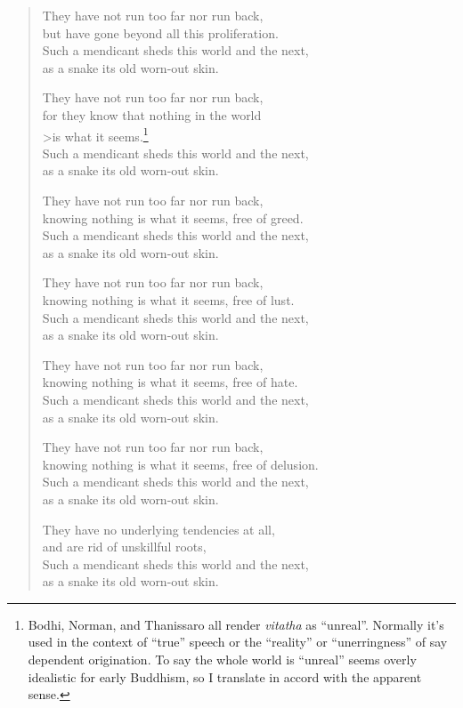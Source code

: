 \documentclass[12pt,openany]{book}%
\begin{document}
\begin{verse}
They have not run too far nor run back, \\
but have gone beyond all this proliferation. \\
Such a mendicant sheds this world and the next, \\
as a snake its old worn-out skin. 

They have not run too far nor run back, \\
for they know that nothing in the world \\>is what it seems.\footnote{Bodhi, Norman, and Thanissaro all render \textit{vitatha} as “unreal”. Normally it’s used in the context of “true” speech or the “reality” or “unerringness” of say dependent origination. To say the whole world is “unreal” seems overly idealistic for early Buddhism, so I translate in accord with the apparent sense. } \\
Such a mendicant sheds this world and the next, \\
as a snake its old worn-out skin. 

They have not run too far nor run back, \\
knowing nothing is what it seems, free of greed. \\
Such a mendicant sheds this world and the next, \\
as a snake its old worn-out skin. 

They have not run too far nor run back, \\
knowing nothing is what it seems, free of lust. \\
Such a mendicant sheds this world and the next, \\
as a snake its old worn-out skin. 

They have not run too far nor run back, \\
knowing nothing is what it seems, free of hate. \\
Such a mendicant sheds this world and the next, \\
as a snake its old worn-out skin. 

They have not run too far nor run back, \\
knowing nothing is what it seems, free of delusion. \\
Such a mendicant sheds this world and the next, \\
as a snake its old worn-out skin. 

They have no underlying tendencies at all, \\
and are rid of unskillful roots, \\
Such a mendicant sheds this world and the next, \\
as a snake its old worn-out skin. 


\end{verse}
\end{document}
